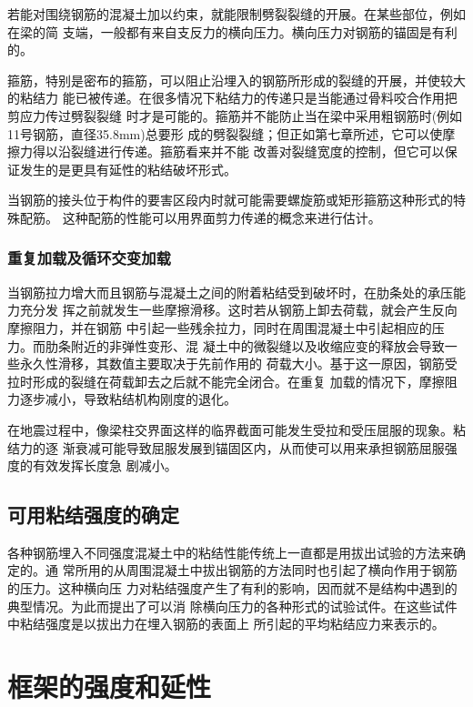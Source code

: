 \documentclass[12pt,a4paper]{book}
\begin{document}
若能对围绕钢筋的混凝土加以约束，就能限制劈裂裂缝的开展。在某些部位，例如在梁的简
支端，一般都有来自支反力的横向压力。横向压力对钢筋的锚固是有利的。

箍筋，特别是密布的箍筋，可以阻止沿埋入的钢筋所形成的裂缝的开展，并使较大的粘结力
能已被传递。在很多情况下粘结力的传递只是当能通过骨料咬合作用把剪应力传过劈裂裂缝
时才是可能的。箍筋并不能防止当在梁中采用粗钢筋时(例如11号钢筋，直径35.8mm)总要形
成的劈裂裂缝；但正如第七章所述，它可以使摩擦力得以沿裂缝进行传递。箍筋看来并不能
改善对裂缝宽度的控制，但它可以保证发生的是更具有延性的粘结破坏形式。

当钢筋的接头位于构件的要害区段内时就可能需要螺旋筋或矩形箍筋这种形式的特殊配筋。
这种配筋的性能可以用界面剪力传递的概念来进行估计。

\subsection{重复加载及循环交变加载}

当钢筋拉力增大而且钢筋与混凝土之间的附着粘结受到破坏时，在肋条处的承压能力充分发
挥之前就发生一些摩擦滑移。这时若从钢筋上卸去荷载，就会产生反向摩擦阻力，并在钢筋
中引起一些残余拉力，同时在周围混凝土中引起相应的压力。而肋条附近的非弹性变形、混
凝土中的微裂缝以及收缩应变的释放会导致一些永久性滑移，其数值主要取决于先前作用的
荷载大小。基于这一原因，钢筋受拉时形成的裂缝在荷载卸去之后就不能完全闭合。在重复
加载的情况下，摩擦阻力逐步减小，导致粘结机构刚度的退化。

在地震过程中，像梁柱交界面这样的临界截面可能发生受拉和受压屈服的现象。粘结力的逐
渐衰减可能导致屈服发展到锚固区内，从而使可以用来承担钢筋屈服强度的有效发挥长度急
剧减小。

\section{可用粘结强度的确定}

各种钢筋埋入不同强度混凝土中的粘结性能传统上一直都是用拔出试验的方法来确定的。通
常所用的从周围混凝土中拔出钢筋的方法同时也引起了横向作用于钢筋的压力。这种横向压
力对粘结强度产生了有利的影响，因而就不是结构中遇到的典型情况。为此而提出了可以消
除横向压力的各种形式的试验试件。在这些试件中粘结强度是以拔出力在埋入钢筋的表面上
所引起的平均粘结应力来表示的。



\chapter{框架的强度和延性}
\end{document}

